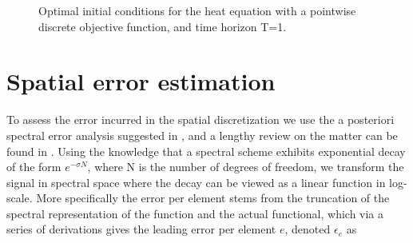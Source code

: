 \documentclass[10pt]{article}
\begin{document}
\begin{figure}[!ht]
\centering
{}
\quad
{}
\caption{Optimal initial conditions for the heat equation with a pointwise discrete objective function, and time horizon T=1.}
\end{figure}

\section{Spatial error estimation}

To assess the error incurred in the spatial discretization we use the a posteriori spectral error analysis suggested in \cite{Mavriplis1990}, and a lengthy review on the matter can be found in \cite{kopriva2009}. Using the knowledge that a spectral scheme exhibits exponential decay of the form $e^{-\sigma N}$, where N is the number of degrees of freedom, we transform the signal in spectral space where the decay can be viewed as a linear function in log-scale. More specifically the error per element stems from the truncation of the spectral representation of the function and the actual functional, which via a series of derivations gives the leading error per element $e$, denoted $\epsilon_e$ as
\end{document}
